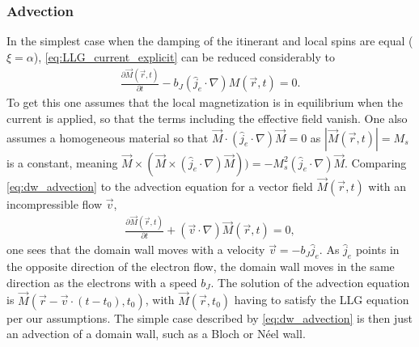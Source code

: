 \documentclass[12pt, a4paper, twoside, openright]{article}		%
\numberwithin{equation}{section}
\begin{document}
\subsubsection{Advection}
In the simplest case when the damping of the itinerant and local spins are equal ($\xi = \alpha$), \eqref{eq:LLG_current_explicit} can be reduced considerably to
\begin{align}
\label{eq:dw_advection}
\frac{\partial \vec{M}(\vec{r}, t)}{\partial t} - b_J(\hat{j}_e\cdot\nabla) M(\vec{r}, t) = 0.
\end{align}
To get this one assumes that the local magnetization is in equilibrium when the current is applied, so that the terms including the effective field vanish. One also assumes a homogeneous material so that $\vec{M}\cdot(\hat{j}_e\cdot\nabla)\vec{M} = 0$ as $|\vec{M}(\vec{r}, t)| = M_s$ is a constant, meaning $\vec{M}\times (\vec{M}\times(\hat{j}_e\cdot\nabla)\vec{M})) = -M_s^2(\hat{j}_e\cdot\nabla)\vec{M}$. Comparing \eqref{eq:dw_advection} to the advection equation for a vector field $\vec{M}(\vec{r}, t)$ with an incompressible flow $\vec{v}$,
\begin{align}
\label{eq:advection}
\frac{\partial \vec{M}(\vec{r}, t)}{\partial t} + (\vec{v}\cdot\nabla) \vec{M}(\vec{r}, t) = 0,
\end{align}
one sees that the domain wall moves with a velocity $\vec{v} = -b_J \hat{j}_e$. As $\hat{j}_e$ points in the opposite direction of the electron flow, the domain wall moves in the same direction as the electrons with a speed $b_J$. The solution of the advection equation is $\vec{M}(\vec{r} - \vec{v} \cdot (t - t_0), t_0)$, with $\vec{M}(\vec{r}, t_0)$ having to satisfy the LLG equation per our assumptions. The simple case described by \eqref{eq:dw_advection} is then just an advection of a domain wall, such as a Bloch or N\'{e}el wall.
\end{document}
